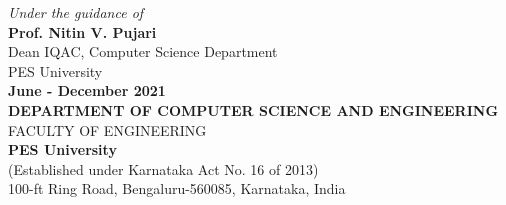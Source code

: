 \begin{titlepage}
\begin{center}
\begin{table}[H]
{\begin{tabular}{cc}
  \end{tabular}
  }
\end{table}

\large \textit{Under the guidance  of}\\\vspace{0.22in} \textbf{Prof. Nitin V. Pujari} \\ \large Dean IQAC, Computer Science Department\\PES University\\
\vspace{0.4in}
\normalsize \color[HTML]{ad4d45} \textbf{June - December 2021}\\
\color{black}
\vspace{0.4in}
\large \textbf{DEPARTMENT OF COMPUTER SCIENCE AND ENGINEERING}\\ \large FACULTY OF ENGINEERING\\
\large  \textbf{PES University}\\



\normalsize{(Established under Karnataka Act No. 16 of 2013)}\\\normalsize{100-ft Ring Road, Bengaluru-560085, Karnataka, India}
\end{center}



\end{titlepage}